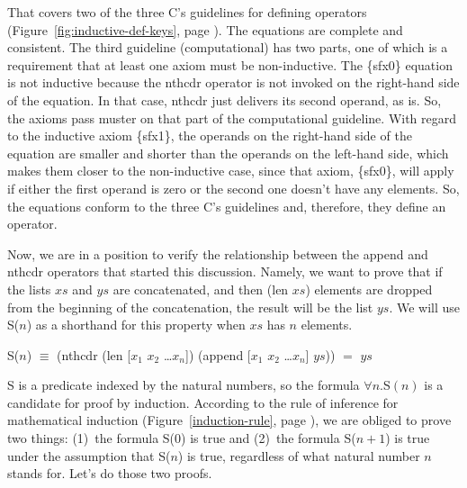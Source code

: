 That covers two of the three C's guidelines for defining operators
(Figure~\ref{fig:inductive-def-keys}, page \pageref{fig:inductive-def-keys}).
The equations are complete and consistent.
The third guideline (computational) has two parts, one of which is
a requirement that at least one axiom must be non-inductive.
The \{sfx0\} equation is not inductive because the nthcdr operator
is not invoked on the right-hand side of the equation.
In that case, nthcdr just delivers its second operand, as is.
So, the axioms pass muster on that part of the computational guideline.
With regard to the inductive axiom \{sfx1\},
the operands on the right-hand side of the equation are
smaller and shorter than the operands on the left-hand side,
which makes them closer to the non-inductive case,
since that axiom, \{sfx0\}, will apply if either the first
operand is zero or the second one doesn't have any elements.
So, the equations conform to the three C's guidelines and,
therefore, they define an operator.

Now, we are in a position to verify the relationship
between the append and nthcdr operators that started this discussion.
Namely, we want to prove that if the lists $xs$ and $ys$ are concatenated,
and then (len $xs$) elements are dropped from the beginning of the
concatenation, the result will be the list $ys$.
We will use S($n$) as a shorthand for this property
when $xs$ has $n$ elements.

\begin{samepage}
\begin{center}
S($n$) $\equiv$ (nthcdr (len [$x_1$ $x_2$ \dots $x_n$]) (append [$x_1$ $x_2$ \dots $x_n$] $ys$)) $=$ $ys$
\end{center}
\end{samepage}


S is a predicate indexed by the natural numbers,
so the formula $\forall n.$S$(n)$ is a candidate for proof by induction.
According to the rule of inference for mathematical induction
(Figure~\ref{induction-rule}, page \pageref{induction-rule}),
we are obliged to prove two things:
(1)~the formula S(0) is true and
(2)~the formula S($n+1$) is true under the assumption that S($n$) is true,
regardless of what natural number $n$ stands for. Let's do those two proofs.

